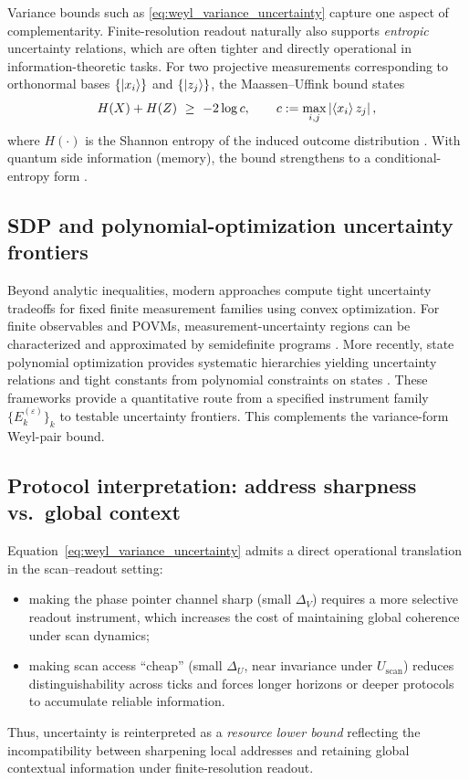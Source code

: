 Variance bounds such as \eqref{eq:weyl_variance_uncertainty} capture one aspect of complementarity.
Finite-resolution readout naturally also supports \emph{entropic} uncertainty relations, which are often tighter and directly operational in information-theoretic tasks.
For two projective measurements corresponding to orthonormal bases $\{\ket{x_i}\}$ and $\{\ket{z_j}\}$, the Maassen--Uffink bound states
\[
H(X)+H(Z)\ \ge\ -2\log c,
\qquad
c:=\max_{i,j}\left\lvert \braket{x_i}{z_j}\right\rvert,
\]
where $H(\cdot)$ is the Shannon entropy of the induced outcome distribution \cite{MaassenUffink1988}.
With quantum side information (memory), the bound strengthens to a conditional-entropy form \cite{BertaChristandlColbeckRenesRenner2011}.

\subsection{SDP and polynomial-optimization uncertainty frontiers}
\label{sec:sdp_uncertainty}

Beyond analytic inequalities, modern approaches compute tight uncertainty tradeoffs for fixed finite measurement families using convex optimization.
For finite observables and POVMs, measurement-uncertainty regions can be characterized and approximated by semidefinite programs \cite{SchwonnekReebWerner2016}.
More recently, state polynomial optimization provides systematic hierarchies yielding uncertainty relations and tight constants from polynomial constraints on states \cite{BermejoMoranHuber2024}.
These frameworks provide a quantitative route from a specified instrument family $\{E_k^{(\varepsilon)}\}_k$ to testable uncertainty frontiers.
This complements the variance-form Weyl-pair bound.

\subsection{Protocol interpretation: address sharpness vs.\ global context}
\label{sec:uncertainty_resource}

Equation~\eqref{eq:weyl_variance_uncertainty} admits a direct operational translation in the scan--readout setting:
\begin{itemize}
\item making the phase pointer channel sharp (small $\Delta_V$) requires a more selective readout instrument, which increases the cost of maintaining global coherence under scan dynamics;
\item making scan access ``cheap'' (small $\Delta_U$, near invariance under $U_{\mathrm{scan}}$) reduces distinguishability across ticks and forces longer horizons or deeper protocols to accumulate reliable information.
\end{itemize}
Thus, uncertainty is reinterpreted as a \emph{resource lower bound} reflecting the incompatibility between sharpening local addresses and retaining global contextual information under finite-resolution readout.

